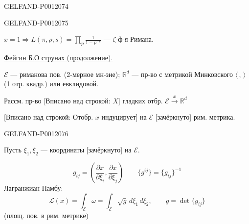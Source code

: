 \begin{GelfandAdjacentEvidence}{GELFAND-P001207}{4}

\end{GelfandAdjacentEvidence}
\begin{GelfandAdjacentEvidence}{GELFAND-P001207}{5}


\(x=1\Rightarrow L(\pi,\rho,s)=\prod_p\frac{1}{1-p^{-s}}\)
--- \(\zeta\)-ф-я Римана.

\underline{\underline{Фейгин Б.}}\qquad\underline{О струнах (продолжение).}

\(\mathcal E\) --- риманова пов. (2-мерное мн-зие);
\(\mathbb R^d\) --- пр-во с метрикой Минковского
\(\langle\, , \,\rangle\) (1 отр. квадр.) или евклидовой.

Рассм. пр-во [Вписано над строкой: \(X\)] гладких отбр.
\(\mathcal E\overset{x}{\longrightarrow}\mathbb R^d\)

[Вписано над строкой: Отобр. \(x\) индуцирует]
на \(\mathcal E\) [зачёркнуто] рим. метрика.
\end{GelfandAdjacentEvidence}
\begin{GelfandAdjacentEvidence}{GELFAND-P001207}{6}


Пусть \(\xi_1,\xi_2\) --- координаты [зачёркнуто] на \(\mathcal E\).
\end{GelfandAdjacentEvidence}

\begin{equation*}
g_{ij}=\left(\frac{\partial x}{\partial\xi_i},
\frac{\partial x}{\partial\xi_j}\right)
\qquad \{g^{ij}\}=\{g_{ij}\}^{-1}
\tag{1}
\end{equation*}
Лагранжиан Намбу:
\begin{equation*}
\mathcal L(x)=\int_{\mathcal E}\omega
=\int_{\mathcal E}\sqrt g\,d\xi_1\,d\xi_2,
\qquad g=\det\{g_{ij}\}
\tag{2}
\end{equation*}
(площ. пов. в рим. метрике)


